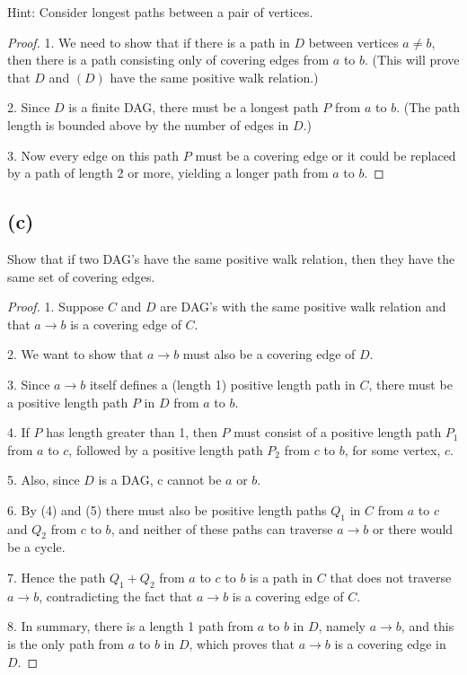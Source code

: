 \documentclass[14pt]{extarticle}
\begin{document}
Hint: Consider longest paths between a pair of vertices.
\begin{proof}
1. We need to show that if there is a path in $D$ between vertices $a \neq b$, then there is a path consisting only of covering edges from $a$ to $b$. (This will prove that $D$ and $(D)$ have the same positive walk relation.)

2. Since $D$ is a finite DAG, there must be a longest path $P$ from $a$ to $b$. (The path length is bounded above by the number of edges in $D$.)

3. Now every edge on this path $P$ must be a covering edge or it could be replaced by a path of length 2 or more, yielding a longer path from $a$ to $b$.
\end{proof}

\subsection{(c)}
Show that if two DAG's have the same positive walk relation, then they have the same set of covering edges.
\begin{proof}
1. Suppose $C$ and $D$ are DAG’s with the same positive walk relation and that $a \to b$ is a covering edge of $C$. 

2. We want to show that $a \to b$ must also be a covering edge of $D$.

3. Since $a \to b$ itself defines a (length 1) positive length path in $C$, there must be a positive length path $P$ in $D$ from $a$ to $b$. 

4. If $P$ has length greater than 1, then $P$ must consist of a positive length path $P_1$ from $a$ to $c$, followed by a positive length path $P_2$ from $c$ to $b$, for some vertex, $c$. 

5. Also, since $D$ is a DAG, c cannot be $a$ or $b$.

6. By (4) and (5) there must also be positive length paths $Q_1$ in $C$ from $a$ to $c$ and $Q_2$ from $c$ to $b$, and neither of these paths can traverse $a \to b$ or there would be a cycle. 

7. Hence the path $Q_1 + Q_2$ from $a$ to $c$ to $b$ is a path in $C$ that does not traverse $a \to b$, contradicting the fact that $a \to b$ is a covering edge of $C$.

8. In summary, there is a length 1 path from $a$ to $b$ in $D$, namely $a \to b$, and this is the only path from $a$ to $b$ in $D$, which proves that $a \to b$ is a covering edge in $D$.
\end{proof}
\end{document}
